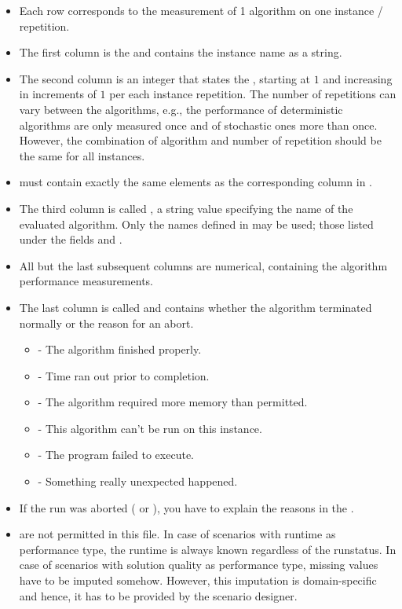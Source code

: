 \documentclass[]{elsarticle}
\begin{document}
\begin{itemize}
  	\item Each row corresponds to the measurement of 1 algorithm on one instance / repetition.
  	\item The first column is the  and contains the instance name as a string. 
  	\item The second column is an integer that states the , starting at $1$ and increasing 
		in increments of $1$ per each instance repetition. The number of repetitions can vary between the algorithms,
		e.g., the performance of deterministic algorithms are only measured once and of stochastic ones more than once.
		However, the combination of algorithm and number of repetition should be the same for all instances.
   	\item {} must contain exactly the same elements as the corresponding column in
 		.
  	\item The third column is called , a string value specifying the name of the 
		evaluated algorithm. Only the names defined in  may be used; those listed
		under the fields  and . 
  	\item All but the last subsequent columns are numerical, containing the algorithm performance 
		measurements.
  	\item The last column is called  and contains whether the algorithm terminated 
		normally or the reason for an abort. 
		\begin{itemize}
      			\item {}  - The algorithm finished properly.
      			\item {} - Time ran out prior to completion.
      			\item {} - The algorithm required more memory than permitted.
      			\item {} - This algorithm can't be run on this instance. 
			\item {} - The program failed to execute.
      			\item {} - Something really unexpected happened.
  		\end{itemize}
  	\item If the run was aborted ( or ), you have to explain the reasons 
		in the .
  	\item \qm are not permitted in this file. In case of scenarios with runtime as performance type, the runtime is always known regardless of the runstatus. In case of scenarios with solution quality as performance type, missing values have to be imputed somehow. However, this imputation is domain-specific and hence, it has to be provided by the scenario designer.
\end{itemize}
\end{document}
